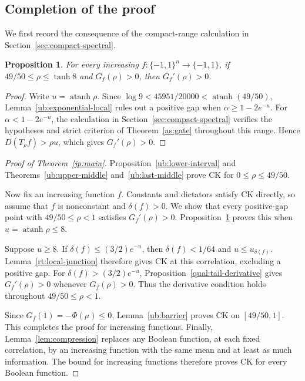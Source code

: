 \documentclass[11pt,letterpaper]{amsart}
\newcommand{\1}{\mathbf 1}
\DeclareMathOperator{\atanh}{atanh}
\newtheorem{proposition}[theorem]{Proposition}
\numberwithin{equation}{section}
\begin{document}
\subsection{Completion of the proof}\label{ub:high-cover}

We first record the consequence of the compact-range calculation
in Section~\ref{sec:compact-spectral}.

\begin{proposition}\label{ub:compact-gate}
For every increasing $f:\{-1,1\}^n\to\{-1,1\}$, if
$49/50\le\rho\le\tanh8$ and $G_f(\rho)>0$, then
$G_f'(\rho)>0$.
\end{proposition}

\begin{proof}
Write $u=\atanh\rho$.
Since
$\log9<45951/20000<\atanh(49/50)$,
Lemma~\ref{ub:exponential-local} rules out a positive gap when
$\alpha\ge1-2e^{-u}$.
For $\alpha<1-2e^{-u}$, the calculation in
Section~\ref{sec:compact-spectral} verifies the hypotheses and
strict criterion of Theorem~\ref{as:gate} throughout this range.
Hence $D(T_\rho f)>\rho u$, which gives $G_f'(\rho)>0$.
\end{proof}

\begin{proof}[Proof of Theorem~\ref{jp:main}]
Proposition~\ref{ub:lower-interval} and
Theorems~\ref{ub:upper-middle} and~\ref{ub:last-middle}
prove CK for $0\le\rho\le49/50$.

Now fix an increasing function $f$.
Constants and dictators satisfy CK directly, so assume that
$f$ is nonconstant and $\delta(f)>0$.
We show that every positive-gap point with $49/50\le\rho<1$
satisfies $G_f'(\rho)>0$.
Proposition~\ref{ub:compact-gate} proves this when
$u=\atanh\rho\le8$.

Suppose $u\ge8$.
If $\delta(f)\le(3/2)e^{-u}$, then
$\delta(f)<1/64$ and $u\le u_{\delta(f)}$.
Lemma~\ref{rt:local-junction} therefore gives CK at this
correlation, excluding a positive gap.
For $\delta(f)>(3/2)e^{-u}$,
Proposition~\ref{qual:tail-derivative} gives
$G_f'(\rho)>0$ whenever $G_f(\rho)>0$.
Thus the derivative condition holds throughout $49/50\le\rho<1$.

Since $G_f(1)=-\Phi(\mu)\le0$,
Lemma~\ref{ub:barrier} proves CK on $[49/50,1]$.
This completes the proof for increasing functions.
Finally, Lemma~\ref{lem:compression} replaces any Boolean function,
at each fixed correlation, by an increasing function with the same
mean and at least as much information.
The bound for increasing functions therefore proves CK for every
Boolean function.
\end{proof}
\end{document}

